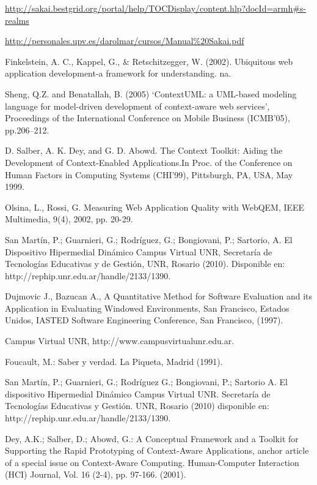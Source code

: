 \begin{thebibliography}{1}
{
\url{
http://sakai.bestgrid.org/portal/help/TOCDisplay/content.hlp?docId=armh#s-realms
}


\url{
http://personales.upv.es/darolmar/cursos/Manual\%20Sakai.pdf
}


 Finkelstein, A. C., Kappel, G., & Retschitzegger, W. (2002). Ubiquitous web application development-a framework for understanding. na.


Sheng, Q.Z. and Benatallah, B. (2005) ‘ContextUML: a UML-based modeling
language for model-driven development of context-aware web services’,
Proceedings of the International Conference on Mobile Business (ICMB’05),
pp.206–212.

D. Salber, A. K. Dey, and G. D. Abowd. The Context Toolkit: Aiding the
Development of Context-Enabled Applications.In Proc. of the Conference on Human
Factors in Computing Systems (CHI’99), Pittsburgh, PA, USA, May 1999.


Olsina, L., Rossi, G. Measuring Web Application Quality with WebQEM, IEEE
Multimedia, 9(4), 2002, pp. 20-29.


San Martín, P.; Guarnieri, G.; Rodríguez, G.; Bongiovani, P.; Sartorio, A. El
Dispositivo Hipermedial Dinámico Campus Virtual UNR, Secretaría de Tecnologías
Educativas y de Gestión, UNR, Rosario (2010). Disponible en:
http://rephip.unr.edu.ar/handle/2133/1390.

Dujmovic J., Bazucan A., A Quantitative Method for Software Evaluation and its
Application in Evaluating Windowed Environments, San Francisco, Estados Unidos,
IASTED Software Engineering Conference, San Francisco, (1997).


Campus Virtual UNR, http://www.campusvirtualunr.edu.ar.

\bibitem{}
Foucault, M.: Saber y verdad. La Piqueta, Madrid (1991).

\bibitem{}
San Martín, P.; Guarnieri, G.; Rodríguez G.; Bongiovani, P.; Sartorio A. El
dispositivo Hipermedial Dinámico Campus Virtual UNR. Secretaría de Tecnologías
Educativas y Gestión. UNR, Rosario (2010) disponible
en: http://rephip.unr.edu.ar/handle/2133/1390.

\bibitem{}
Dey, A.K.; Salber, D.; Abowd, G.: A Conceptual Framework and a Toolkit for
Supporting the Rapid Prototyping of Context-Aware Applications, anchor article
of a special issue on Context-Aware Computing. Human-Computer Interaction (HCI)
Journal, Vol. 16 (2-4), pp. 97-166. (2001).


}
\end{thebibliography}
